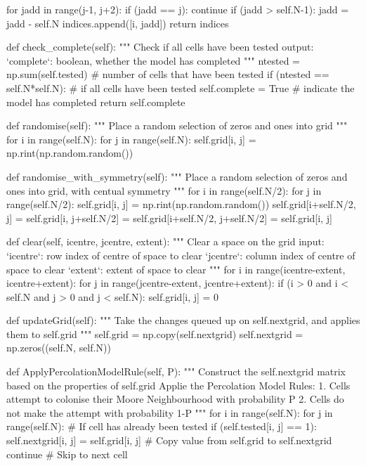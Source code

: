 \documentclass[bibend=bibtex,lang=cn,11pt,a4paper]{elegantpaper}
\begin{document}
\begin{python}
        for jadd in range(j-1, j+2):
            if (jadd == j):
                continue
            if (jadd > self.N-1):
                jadd = jadd - self.N
            indices.append([i, jadd])
        return indices

    def check_complete(self):
        """
        Check if all cells have been tested
        output:
            `complete`: boolean, whether the model has completed
        """
        ntested = np.sum(self.tested)   # number of cells that have been tested
        if (ntested == self.N*self.N):  # if all cells have been tested
            self.complete = True        # indicate the model has completed
        return self.complete

    def randomise(self):
        """
        Place a random selection of zeros and ones into grid
        """
        for i in range(self.N):
            for j in range(self.N):
                self.grid[i, j] = np.rint(np.random.random())

    def randomise_with_symmetry(self):
        """
        Place a random selection of zeros and ones into grid, with centual symmetry
        """
        for i in range(self.N/2):
            for j in range(self.N/2):
                self.grid[i, j] = np.rint(np.random.random())
                self.grid[i+self.N/2, j] = self.grid[i, j+self.N/2] = self.grid[i+self.N/2, j+self.N/2] = self.grid[i, j]

    def clear(self, icentre, jcentre, extent):
        """
        Clear a space on the grid
        input:
            `icentre`: row index of centre of space to clear
            `jcentre`: column index of centre of space to clear
            `extent`: extent of space to clear
        """
        for i in range(icentre-extent, icentre+extent):
            for j in range(jcentre-extent, jcentre+extent):
                if (i > 0 and i < self.N and j > 0 and j < self.N):
                    self.grid[i, j] = 0

    def updateGrid(self):
        """
        Take the changes queued up on self.nextgrid, and applies them to self.grid
        """
        self.grid = np.copy(self.nextgrid)
        self.nextgrid = np.zeros((self.N, self.N))

    def ApplyPercolationModelRule(self, P):
        """
        Construct the self.nextgrid matrix based on the properties of self.grid
        Applie the Percolation Model Rules:
            1. Cells attempt to colonise their Moore Neighbourhood with probability P
            2. Cells do not make the attempt with probability 1-P
        """
        for i in range(self.N):
            for j in range(self.N):
                # If cell has already been tested
                if (self.tested[i, j] == 1):
                    self.nextgrid[i, j] = self.grid[i, j]  # Copy value from self.grid to self.nextgrid
                    continue                               # Skip to next cell


\end{python}
\end{document}
